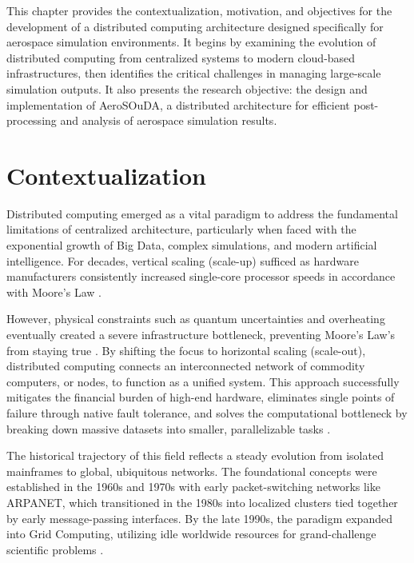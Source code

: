 This chapter provides the contextualization, motivation, and objectives for the development of a distributed computing architecture designed specifically for aerospace simulation environments. It begins by examining the evolution of distributed computing from centralized systems to modern cloud-based infrastructures, then identifies the critical challenges in managing large-scale simulation outputs. It also presents the research objective: the design and implementation of AeroSOuDA, a distributed architecture for efficient post-processing and analysis of aerospace simulation results.

\section{Contextualization}
\label{sec:cap1-contextualization}

Distributed computing emerged as a vital paradigm to address the fundamental limitations of centralized architecture, particularly when faced with the exponential growth of Big Data, complex simulations, and modern artificial intelligence. For decades, vertical scaling (scale-up) sufficed as hardware manufacturers consistently increased single-core processor speeds in accordance with Moore's Law \parencite{hennessy2019architecture}. 

However, physical constraints such as quantum uncertainties and overheating eventually created a severe infrastructure bottleneck, preventing Moore's Law's from staying true \parencite{waldrop2016moore}. By shifting the focus to horizontal scaling (scale-out), distributed computing connects an interconnected network of commodity computers, or nodes, to function as a unified system. This approach successfully mitigates the financial burden of high-end hardware, eliminates single points of failure through native fault tolerance, and solves the computational bottleneck by breaking down massive datasets into smaller, parallelizable tasks \parencite{sevilla2015framework}.

The historical trajectory of this field reflects a steady evolution from isolated mainframes to global, ubiquitous networks. The foundational concepts were established in the 1960s and 1970s with early packet-switching networks like ARPANET, which transitioned in the 1980s into localized clusters tied together by early message-passing interfaces. By the late 1990s, the paradigm expanded into Grid Computing, utilizing idle worldwide resources for grand-challenge scientific problems \parencite{foster2003grid}. 

